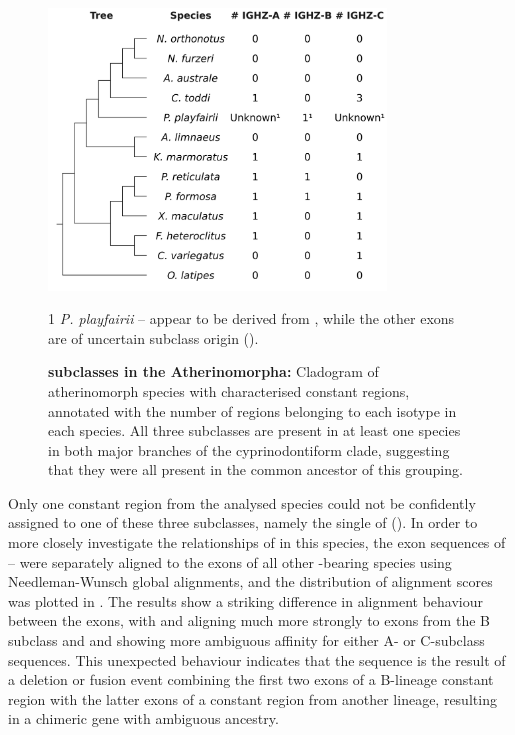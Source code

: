 \begin{figure}
\centering
\includegraphics[width=0.8\textwidth]{_Figures/png/multispecies-cz-subclasses}
\begin{minipage}{0.7\textwidth}
\footnotesize
\begin{threeparttable}
\begin{tablenotes}
\item[1] \textit{P. playfairii}  -- appear to be derived from , while the other exons are of uncertain subclass origin ().
\end{tablenotes}
\end{threeparttable}
\end{minipage}
\caption[ subclasses in the Atherinomorpha]{\textbf{ subclasses in the Atherinomorpha:} Cladogram of atherinomorph species with characterised  constant regions, annotated with the number of regions belonging to each  isotype in each species. All three subclasses are present in at least one species in both major branches of the cyprinodontiform clade, suggesting that they were all present in the common ancestor of this grouping.}
\label{fig:multispecies-cz-subclasses}
\end{figure}


Only one  constant region from the analysed species could not be confidently assigned to one of these three subclasses, namely the single  of  (). In order to more closely investigate the relationships of  in this species, the exon sequences of  -- were separately aligned to the \cz{} exons of all other -bearing species using Needleman-Wunsch global alignments, and the distribution of alignment scores was plotted in 
. The results show a striking difference in alignment behaviour between the exons, with  and  aligning much more strongly to exons from the B subclass and  and  showing more ambiguous affinity for either A- or C-subclass sequences. This unexpected behaviour indicates that the   sequence is the result of a deletion or fusion event combining the first two exons of a B-lineage  constant region with the latter exons of a constant region from another lineage, resulting in a chimeric gene with ambiguous ancestry.

